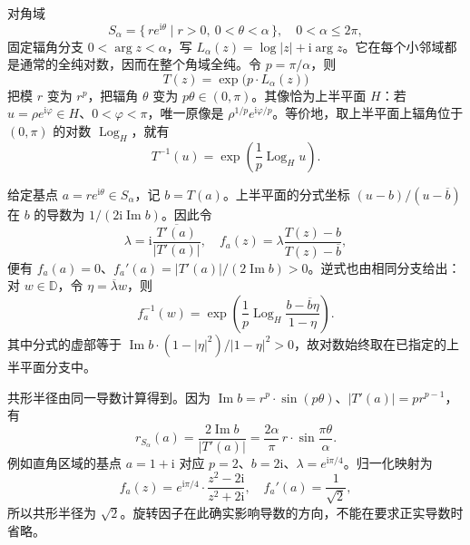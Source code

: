 \ProseParagraphBreak

对角域
\[
 S_\alpha=\{\,re^{\mathrm{i}\theta}\mid r>0,\ 0<\theta<\alpha\,\},
 \quad 0<\alpha\le2\pi,
\]
固定辐角分支 \(0<\arg z<\alpha\)，写 \(L_\alpha(z)=\log|z|+\mathrm{i}\arg z\)。它在每个小邻域都是通常的全纯对数，因而在整个角域全纯。令 \(p=\pi/\alpha\)，则
\[
 T(z)=\exp\bigl(p\cdot L_\alpha(z)\bigr)
\]
把模 \(r\) 变为 \(r^p\)，把辐角 \(\theta\) 变为 \(p\theta\in(0,\pi)\)。其像恰为上半平面 \(H\)：若 \(u=\rho e^{\mathrm{i}\varphi}\in H\)、\(0<\varphi<\pi\)，唯一原像是 \(\rho^{1/p}e^{\mathrm{i}\varphi/p}\)。等价地，取上半平面上辐角位于 \((0,\pi)\) 的对数 \(\operatorname{Log}_H\)，就有
\[
 T^{-1}(u)=\exp\left(\frac1p\operatorname{Log}_H u\right).
\]

给定基点 \(a=re^{\mathrm{i}\theta}\in S_\alpha\)，记 \(b=T(a)\)。上半平面的分式坐标 \((u-b)/(u-\overline b)\) 在 \(b\) 的导数为 \(1/(2\mathrm{i}\operatorname{Im}b)\)。因此令
\[
 \lambda=\mathrm{i}\frac{\overline{T'(a)}}{|T'(a)|},
 \quad f_a(z)=\lambda\frac{T(z)-b}{T(z)-\overline b},
\]
便有 \(f_a(a)=0\)、\(f_a'(a)=|T'(a)|/(2\operatorname{Im}b)>0\)。逆式也由相同分支给出：对 \(w\in\mathbb D\)，令 \(\eta=\overline\lambda w\)，则
\[
 f_a^{-1}(w)
 =\exp\left(\frac1p\operatorname{Log}_H
             \frac{b-\overline b\eta}{1-\eta}\right).
\]
其中分式的虚部等于 \(\operatorname{Im}b\cdot(1-|\eta|^2)/|1-\eta|^2>0\)，故对数始终取在已指定的上半平面分支中。

\ProseParagraphBreak

共形半径由同一导数计算得到。因为 \(\operatorname{Im}b=r^p\cdot\sin(p\theta)\)、\(|T'(a)|=p r^{p-1}\)，有
\[
 r_{S_\alpha}(a)
 =\frac{2\operatorname{Im}b}{|T'(a)|}
 =\frac{2\alpha}{\pi}\,r\cdot\sin\frac{\pi\theta}{\alpha}.
\]
例如直角区域的基点 \(a=1+\mathrm{i}\) 对应 \(p=2\)、\(b=2\mathrm{i}\)、\(\lambda=e^{\mathrm{i}\pi/4}\)。归一化映射为
\[
 f_a(z)=e^{\mathrm{i}\pi/4}\cdot\frac{z^2-2\mathrm{i}}{z^2+2\mathrm{i}},
 \quad f_a'(a)=\frac1{\sqrt2},
\]
所以共形半径为 \(\sqrt2\)。旋转因子在此确实影响导数的方向，不能在要求正实导数时省略。

\ProseParagraphBreak

